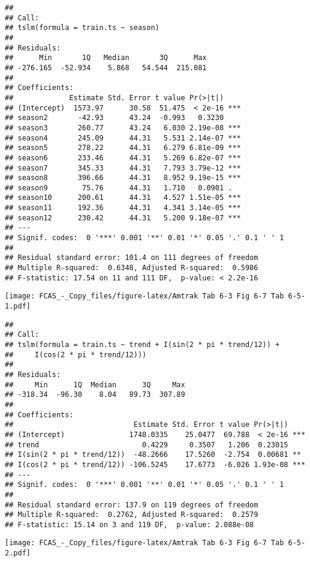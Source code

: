 \documentclass[]{article}
\begin{document}
\begin{verbatim}
## 
## Call:
## tslm(formula = train.ts ~ season)
## 
## Residuals:
##      Min       1Q   Median       3Q      Max 
## -276.165  -52.934    5.868   54.544  215.081 
## 
## Coefficients:
##             Estimate Std. Error t value Pr(>|t|)    
## (Intercept)  1573.97      30.58  51.475  < 2e-16 ***
## season2       -42.93      43.24  -0.993   0.3230    
## season3       260.77      43.24   6.030 2.19e-08 ***
## season4       245.09      44.31   5.531 2.14e-07 ***
## season5       278.22      44.31   6.279 6.81e-09 ***
## season6       233.46      44.31   5.269 6.82e-07 ***
## season7       345.33      44.31   7.793 3.79e-12 ***
## season8       396.66      44.31   8.952 9.19e-15 ***
## season9        75.76      44.31   1.710   0.0901 .  
## season10      200.61      44.31   4.527 1.51e-05 ***
## season11      192.36      44.31   4.341 3.14e-05 ***
## season12      230.42      44.31   5.200 9.18e-07 ***
## ---
## Signif. codes:  0 '***' 0.001 '**' 0.01 '*' 0.05 '.' 0.1 ' ' 1
## 
## Residual standard error: 101.4 on 111 degrees of freedom
## Multiple R-squared:  0.6348, Adjusted R-squared:  0.5986 
## F-statistic: 17.54 on 11 and 111 DF,  p-value: < 2.2e-16
\end{verbatim}

\texttt{[image: FCAS\_-\_Copy\_files/figure-latex/Amtrak Tab 6-3 Fig 6-7 Tab 6-5-1.pdf]}

\begin{verbatim}
## 
## Call:
## tslm(formula = train.ts ~ trend + I(sin(2 * pi * trend/12)) + 
##     I(cos(2 * pi * trend/12)))
## 
## Residuals:
##     Min      1Q  Median      3Q     Max 
## -318.34  -96.30    8.04   89.73  307.89 
## 
## Coefficients:
##                            Estimate Std. Error t value Pr(>|t|)    
## (Intercept)               1748.0335    25.0477  69.788  < 2e-16 ***
## trend                        0.4229     0.3507   1.206  0.23015    
## I(sin(2 * pi * trend/12))  -48.2666    17.5260  -2.754  0.00681 ** 
## I(cos(2 * pi * trend/12)) -106.5245    17.6773  -6.026 1.93e-08 ***
## ---
## Signif. codes:  0 '***' 0.001 '**' 0.01 '*' 0.05 '.' 0.1 ' ' 1
## 
## Residual standard error: 137.9 on 119 degrees of freedom
## Multiple R-squared:  0.2762, Adjusted R-squared:  0.2579 
## F-statistic: 15.14 on 3 and 119 DF,  p-value: 2.088e-08
\end{verbatim}

\texttt{[image: FCAS\_-\_Copy\_files/figure-latex/Amtrak Tab 6-3 Fig 6-7 Tab 6-5-2.pdf]}
\end{document}
